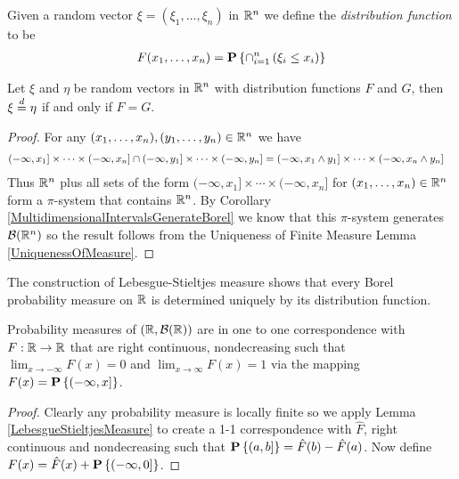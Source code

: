 \begin{defn}Given a random vector $\xi = (\xi_1, \dots, \xi_n)$ in
  $\mathbb{R}^n$ we define the \emph{distribution function} to be 
\begin{align*}
F(x_1, \dots, x_n) = \textbf{P}\left \{\cap_{i=1}^n \left ( \xi_i \leq x_i
    \right )  \right \}
\end{align*}
\end{defn}
\begin{lem}\label{DistributionFunctionCharacterizeProbability}Let $\xi$ and $\eta$ be random vectors in $\mathbb{R}^n$ with
  distribution functions $F$ and $G$, then
  $\xi \overset{d}= \eta$ if and only if $F = G$.
\end{lem}
\begin{proof}
For any $(x_1, \dotsc, x_n), (y_1, \dotsc, y_n) \in \mathbb{R}^n$ we have
\begin{align*}
(-\infty, x_1] \times \cdots \times (-\infty,  x_n] \cap (-\infty,
  y_1] \times \cdots \times (-\infty, y_n]
&= (-\infty, x_1 \wedge y_1] \times \cdots \times (-\infty,  x_n  \wedge y_n] 
\end{align*}
Thus  $\mathbb{R}^n$ plus all sets of the form $(-\infty, x_1] \times \cdots \times (-\infty,
  x_n]$ for $(x_1, \dotsc, x_n) \in \mathbb{R}^n$ form a $\pi$-system that contains $\mathbb{R}^n$.  By Corollary \ref{MultidimensionalIntervalsGenerateBorel}
we know that this $\pi$-system generates $\mathcal{B}(\mathbb{R}^n)$ so the result follows from 
the Uniqueness of Finite Measure Lemma \ref{UniquenessOfMeasure}.
\end{proof}

The construction of Lebesgue-Stieltjes measure shows that every
Borel probability measure on $\mathbb{R}$ is determined uniquely by its distribution function.
\begin{lem}\label{CumulativeDistributionFunctions}Probability measures of $(\mathbb{R}, \mathcal{B}(\mathbb{R}))$ are
  in one to one correspondence with $F : \mathbb{R} \to \mathbb{R}$ that are
  right continuous, nondecreasing such that $\lim_{x \to -\infty} F(x)
  = 0$ and $\lim_{x \to \infty} F(x) = 1$ via the mapping $F(x) =
  \textbf{P}\left \{(-\infty, x] \right \}$.
\end{lem}
\begin{proof}Clearly any probability measure is locally finite so we
  apply Lemma \ref{LebesgueStieltjesMeasure} to create a 1-1
  correspondence with $\hat{F}$, 
  right continuous and nondecreasing such that $\textbf{P}\left \{(a,b] \right \} =
  \hat{F}(b) - \hat{F}(a)$.  Now define $F(x) = \hat{F}(x) +
  \textbf{P}\left \{(-\infty, 0] \right \}$.
\end{proof}

